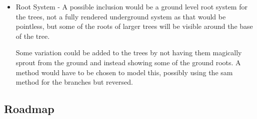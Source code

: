 \documentclass[review]{cmpreport}
\begin{document}
\begin{itemize}
      \item Root System - A possible inclusion would be a ground level root 
            system for the trees, not a fully rendered underground system as 
            that would be pointless, but some of the roots of larger trees 
            will be visible around the base of the tree. \par 
            Some variation could be added to the trees by not having them 
            magically sprout from the ground and instead showing some of the 
            ground roots. A method would have to be chosen to model this, 
            possibly using the sam method for the branches but reversed.
\end{itemize}

\subsection{Roadmap}
\end{document}
